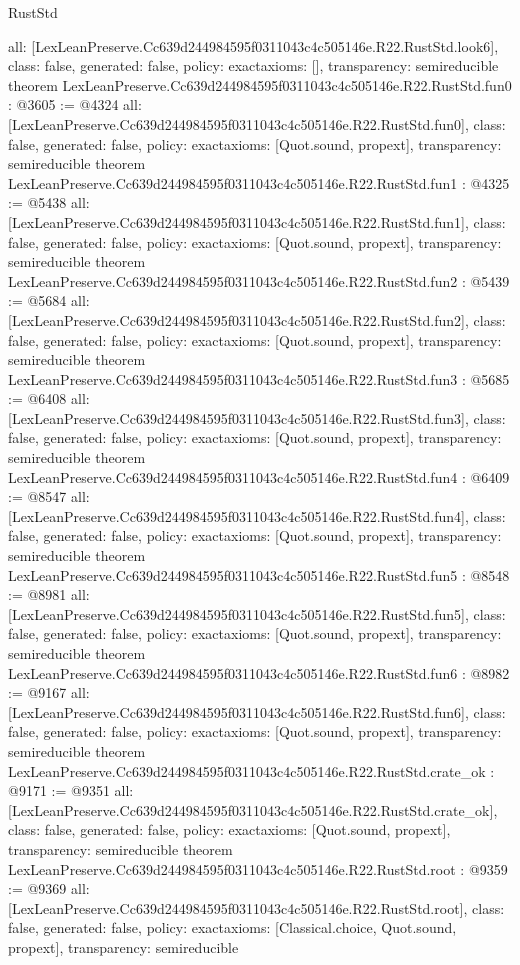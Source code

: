 \begin{lexlean}{RustStd}
\begin{coremodule}
{  all: [LexLeanPreserve.Cc639d244984595f0311043c4c505146e.R22.RustStd.look6],
  class: false,
  generated: false,
  policy: exact{axioms: []},
  transparency: semireducible
}
theorem LexLeanPreserve.Cc639d244984595f0311043c4c505146e.R22.RustStd.fun0 : @3605 := @4324 {
  all: [LexLeanPreserve.Cc639d244984595f0311043c4c505146e.R22.RustStd.fun0],
  class: false,
  generated: false,
  policy: exact{axioms: [Quot.sound, propext]},
  transparency: semireducible
}
theorem LexLeanPreserve.Cc639d244984595f0311043c4c505146e.R22.RustStd.fun1 : @4325 := @5438 {
  all: [LexLeanPreserve.Cc639d244984595f0311043c4c505146e.R22.RustStd.fun1],
  class: false,
  generated: false,
  policy: exact{axioms: [Quot.sound, propext]},
  transparency: semireducible
}
theorem LexLeanPreserve.Cc639d244984595f0311043c4c505146e.R22.RustStd.fun2 : @5439 := @5684 {
  all: [LexLeanPreserve.Cc639d244984595f0311043c4c505146e.R22.RustStd.fun2],
  class: false,
  generated: false,
  policy: exact{axioms: [Quot.sound, propext]},
  transparency: semireducible
}
theorem LexLeanPreserve.Cc639d244984595f0311043c4c505146e.R22.RustStd.fun3 : @5685 := @6408 {
  all: [LexLeanPreserve.Cc639d244984595f0311043c4c505146e.R22.RustStd.fun3],
  class: false,
  generated: false,
  policy: exact{axioms: [Quot.sound, propext]},
  transparency: semireducible
}
theorem LexLeanPreserve.Cc639d244984595f0311043c4c505146e.R22.RustStd.fun4 : @6409 := @8547 {
  all: [LexLeanPreserve.Cc639d244984595f0311043c4c505146e.R22.RustStd.fun4],
  class: false,
  generated: false,
  policy: exact{axioms: [Quot.sound, propext]},
  transparency: semireducible
}
theorem LexLeanPreserve.Cc639d244984595f0311043c4c505146e.R22.RustStd.fun5 : @8548 := @8981 {
  all: [LexLeanPreserve.Cc639d244984595f0311043c4c505146e.R22.RustStd.fun5],
  class: false,
  generated: false,
  policy: exact{axioms: [Quot.sound, propext]},
  transparency: semireducible
}
theorem LexLeanPreserve.Cc639d244984595f0311043c4c505146e.R22.RustStd.fun6 : @8982 := @9167 {
  all: [LexLeanPreserve.Cc639d244984595f0311043c4c505146e.R22.RustStd.fun6],
  class: false,
  generated: false,
  policy: exact{axioms: [Quot.sound, propext]},
  transparency: semireducible
}
theorem LexLeanPreserve.Cc639d244984595f0311043c4c505146e.R22.RustStd.crate_ok : @9171 := @9351 {
  all: [LexLeanPreserve.Cc639d244984595f0311043c4c505146e.R22.RustStd.crate_ok],
  class: false,
  generated: false,
  policy: exact{axioms: [Quot.sound, propext]},
  transparency: semireducible
}
theorem LexLeanPreserve.Cc639d244984595f0311043c4c505146e.R22.RustStd.root : @9359 := @9369 {
  all: [LexLeanPreserve.Cc639d244984595f0311043c4c505146e.R22.RustStd.root],
  class: false,
  generated: false,
  policy: exact{axioms: [Classical.choice, Quot.sound, propext]},
  transparency: semireducible
}


\end{coremodule}
\end{lexlean}
